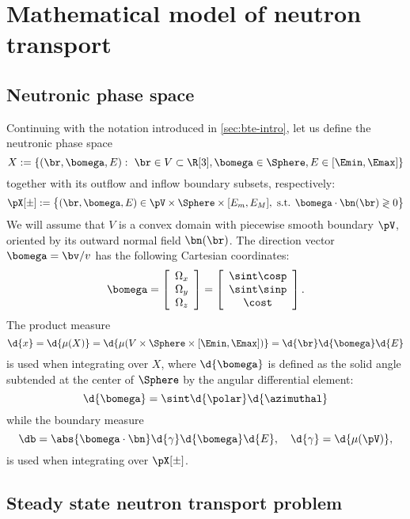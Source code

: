 \chapter{Mathematical model of neutron transport}\label{sec:bte}

\ifpdf
    \graphicspath{{2_BTE/figures/PNG/}{2_BTE/figures/PDF/}{2_BTE/figures/}}
\else
    \graphicspath{{2_BTE/figures/EPS/}{2_BTE/figures/}}
\fi

\section{Neutronic phase space} \label{sec:phase}
Continuing with the notation introduced in \ref{sec:bte-intro}, let us define the neutronic phase space $$
  X := \{(\br,\bomega,E):\ \br\in V\subset\R[3], \bomega\in \Sphere, E \in [\Emin,\Emax]\}
$$ together with its outflow and inflow boundary subsets, respectively:
$$
  \pX[\pm] := \bigl\{ (\br,\bomega,E) \in \pV \times \Sphere \times [E_m, E_M], \mbox{ s.t. } \bomega\cdot\bn(\br)
  \gtrless 0 \bigr\}
$$ We will assume that $V$ is a convex domain with piecewise smooth boundary $\pV$, oriented by its outward normal field
$\bn(\br)$. The direction vector $\bomega = \bv/v$ has the following Cartesian coordinates:
\begin{equation*}
	\bomega = \left[\begin{array}{c}
		\Omega_x \\
		\Omega_y \\
		\Omega_z
	\end{array}\right] = \left[\begin{array}{c}
		\sint\cosp \\
		\sint\sinp \\
		\cost
	\end{array}\right].
\end{equation*}
The product measure
\begin{equation}\label{eq:measure}
  \d{x} = \d{\mu(X)} = \d{\mu(V\times\Sphere\times [\Emin,\Emax])} = \d{\br}\d{\bomega}\d{E}
\end{equation}
is used when integrating over $X$, where $\d{\bomega}$ is defined as the solid angle subtended at the center of
 $\Sphere$ by the angular differential element:
$$
	\d{\bomega} = \sint \d{\polar}\d{\azimuthal}
$$
while the boundary measure
$$
\db = \abs{\bomega\cdot\bn}\d{\gamma}\d{\bomega}\d{E},\quad \d{\gamma} = \d{\mu(\pV)},
$$
is used when integrating over $\pX[\pm]$.

\section{Steady state neutron transport problem}\label{sec:definitions}

